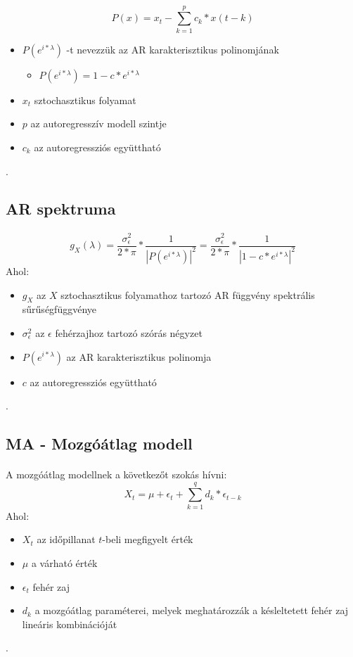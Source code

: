 \documentclass[11pt,a4paper]{article}
\begin{document}
						\paragraph{}
							$$P(x) = x_t - \sum_{k=1}^p c_k*x(t-k)$$
							\begin{itemize}
								\item $P(e^{i*\lambda})$ -t nevezzük az AR karakterisztikus polinomjának
								\begin{itemize}
									\item $P(e^{i*\lambda})=1-c*e^{i*\lambda}$
								\end{itemize}
								\item $x_t$ sztochasztikus folyamat
								\item $p$ az autoregresszív modell szintje
								\item $c_k$ az autoregressziós együttható
							\end{itemize}.
					\subsection{AR spektruma}
							\paragraph{}
								$$g_X(\lambda) = \dfrac{\sigma^2_\epsilon}{2*\pi} * \dfrac{1}{|P(e^{i*\lambda})|^2}= \dfrac{\sigma^2_\epsilon}{2*\pi} * \dfrac{1}{|1- c*e^{i*\lambda}|^2}$$
								Ahol:
								\begin{itemize}
									\item $g_X$ az $X$ sztochasztikus folyamathoz tartozó AR függvény spektrális sűrűségfüggvénye
									\item $\sigma^2_\epsilon$ az $\epsilon$ fehérzajhoz tartozó szórás négyzet
									\item $P(e^{i*\lambda})$ az AR karakterisztikus polinomja
									\item $c$ az autoregressziós együttható
								\end{itemize}.
				\subsection{MA - Mozgóátlag modell}
					\paragraph{}
						A mozgóátlag modellnek a következőt szokás hívni:
						$$X_t = \mu + \epsilon_t + \sum_{k = 1}^q d_k*\epsilon_{t-k}$$
						Ahol:
						\begin{itemize}
							\item $X_t$ az időpillanat $t$-beli megfigyelt érték
							\item $\mu$ a várható érték
							\item $\epsilon_t$ fehér zaj
							\item $d_k$ a mozgóátlag paraméterei, melyek meghatározzák a késleltetett fehér zaj lineáris kombinációját
						\end{itemize}.
\end{document}
